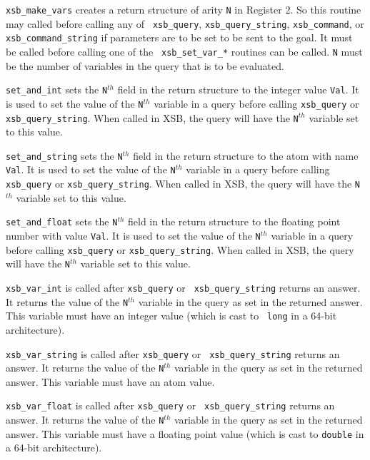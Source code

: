 \begin{description}
 
    {\tt xsb\_make\_vars} creates a return structure of arity {\tt N}
in Register 2.  So this routine may called before calling any of {\tt
xsb\_query}, {\tt xsb\_query\_string}, {\tt xsb\_command}, or {\tt
xsb\_command\_string} if parameters are to be set to be sent to the
goal.  It must be called before calling one of the {\tt
xsb\_set\_var\_*} routines can be called. {\tt N} must be the number
of variables in the query that is to be evaluated.

    {\tt set\_and\_int} sets the {\tt N}$^{th}$ field in the return
structure to the integer value {\tt Val}.  It is used to set the value of
the {\tt N}$^{th}$ variable in a query before calling {\tt xsb\_query} or
{\tt xsb\_query\_string}.  When called in XSB, the query will
have the {\tt N}$^{th}$ variable set to this value.

    {\tt set\_and\_string} sets the {\tt N}$^{th}$ field in the return
structure to the atom with name {\tt Val}.  It is used to set the
value of the {\tt N}$^{th}$ variable in a query before calling {\tt
xsb\_query} or {\tt xsb\_query\_string}.  When called in XSB,
the query will have the {\tt N}$^{th}$ variable set to this value.

    {\tt set\_and\_float} sets the {\tt N}$^{th}$ field in the return
structure to the floating point number with value {\tt Val}.  It is
used to set the value of the {\tt N}$^{th}$ variable in a query before
calling {\tt xsb\_query} or {\tt xsb\_query\_string}.  When called in
XSB, the query will have the {\tt N}$^{th}$ variable set to this
value.

  
{\tt xsb\_var\_int} is called after {\tt xsb\_query} or {\tt
xsb\_query\_string} returns an answer.  It returns the value of the
{\tt N}$^{th}$ variable in the query as set in the returned answer.
This variable must have an integer value (which is cast to {\tt
long} in a 64-bit architecture).

 
    {\tt xsb\_var\_string} is called after {\tt xsb\_query} or {\tt
xsb\_query\_string} returns an answer.  It returns the value of the
{\tt N}$^{th}$ variable in the query as set in the returned answer.
This variable must have an atom value.

 
    {\tt xsb\_var\_float} is called after {\tt xsb\_query} or {\tt
    xsb\_query\_string} returns an answer.  It returns the value of
    the {\tt N}$^{th}$ variable in the query as set in the returned
    answer.  This variable must have a floating point value (which is
    cast to {\tt double} in a 64-bit architecture).


\end{description}


